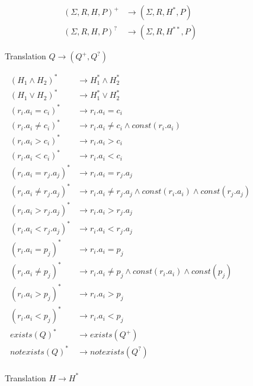 \begin{figure}[H]
\caption{\label{q+} Translation $Q \rightarrow (Q^+,Q^?)$ }
\begin{mdframed}
	\fontsize{8}{6}
\begin{align*}
	(\Sigma,R,H,P)^+ & \rightarrow (\Sigma,R,H^*,P) \\
	(\Sigma,R,H,P)^? & \rightarrow (\Sigma,R,H^{**},P) 
\end{align*}
\end{mdframed}
\end{figure}

\begin{figure}[H]
	\caption{\label{h*} Translation $H \rightarrow H^*$ }
	\begin{mdframed}
		\fontsize{8}{6}
\begin{align*}
	(H_1 \land H_2)^* & \rightarrow H_1^* \land H_2^* \\
	(H_1 \lor H_2)^* & \rightarrow H_1^* \lor H_2^* \\
	(r_i.a_i = c_i)^* & \rightarrow r_i.a_i = c_i \\
	(r_i.a_i \neq c_i)^*& \rightarrow r_i.a_i \neq c_i \land const(r_i.a_i)\\
	(r_i.a_i > c_i)^*& \rightarrow r_i.a_i > c_i \\
	(r_i.a_i < c_i)^*& \rightarrow r_i.a_i < c_i \\
	(r_i.a_i = r_j.a_j)^* & \rightarrow r_i.a_i = r_j.a_j \\
	(r_i.a_i \neq r_j.a_j)^* & \rightarrow r_i.a_i \neq r_j.a_j \land const(r_i.a_i) \land const(r_j.a_j)\\
	(r_i.a_i > r_j.a_j)^* & \rightarrow r_i.a_i > r_j.a_j \\
	(r_i.a_i < r_j.a_j)^* & \rightarrow r_i.a_i < r_j.a_j \\
	(r_i.a_i = p_j)^* & \rightarrow r_i.a_i = p_j \\
	(r_i.a_i \neq p_j)^* & \rightarrow r_i.a_i \neq p_j \land const(r_i.a_i) \land const(p_j)\\
	(r_i.a_i > p_j)^* & \rightarrow r_i.a_i > p_j \\
	(r_i.a_i < p_j)^* & \rightarrow r_i.a_i < p_j \\
	exists(Q)^* & \rightarrow exists(Q^+) \\
	notexists(Q)^* & \rightarrow notexists(Q^?) \\
\end{align*}
\end{mdframed}
\end{figure}

